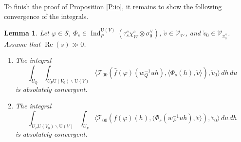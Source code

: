 \documentclass[11pt]{amsart}
\numberwithin{equation}{section}
\theoremstyle{plain}
\newtheorem{lem}[thm]{Lemma}
\theoremstyle{definition}
\theoremstyle{remark}
\def\Ind{\operatorname{Ind}}
\def\Re{\operatorname{Re}}
\def\U{\mathrm{U}}
\def\T{\mathcal{T}}
\def\s{\mathscr{S}}
\def\V{\mathscr{V}}
\begin{document}
To finish the proof of Proposition \ref{P:io}, it remains to show the following convergence of the integrals.

\begin{lem}
\label{lem:conv}
Let $\varphi \in \s$, $\Phi_s \in \Ind^{\U(V)}_P(\tau^c_s \chi_W^c \otimes \sigma_0^\vee)$, $\check{v} \in \V_{\tau^\vee}$, and $\check{v}_0 \in \V_{\pi_0^\vee}$.
Assume that $\Re(s) \gg 0$.
\begin{enumerate}
\item The integral
\begin{equation}
\label{eq:conv1} 
 \int_{U_Q} \int_{U_P \U(V_0) \backslash \U(V)}
 \langle \T_{00} (\hat{f}(\varphi)(w_Q^{-1} u h), 
 \langle \Phi_s(h), \check{v} \rangle ), \check{v}_0 \rangle \, dh \, du 
\end{equation}
is absolutely convergent.
\item The integral
\begin{equation}
\label{eq:conv2} 
 \int_{U_P \U(V_0) \backslash \U(V)} \int_{U_P}
 \langle \T_{00} (f(\varphi)(h), \langle \Phi_s(w_P^{-1} u h), \check{v} \rangle ), \check{v}_0 \rangle \, du \, dh
\end{equation}
is absolutely convergent.
\end{enumerate}
\end{lem}
\end{document}
